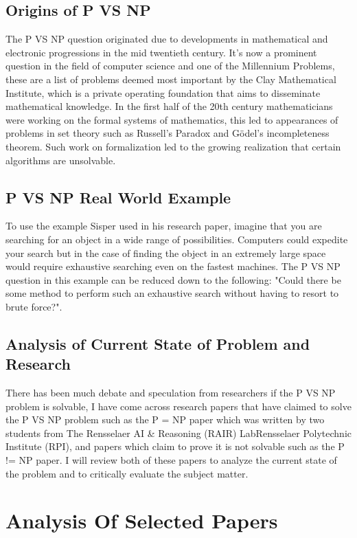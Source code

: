 \documentclass{report}
\begin{document}
\section{Origins of P VS NP}
The P VS NP question originated due to developments in mathematical and electronic progressions in the mid twentieth century\cite{HistoryOfPVsNP}. It's now a prominent question in the field of computer science and one of the Millennium Problems\cite{Millennium}, these are a list of problems deemed most important by the Clay Mathematical Institute, which is a private operating foundation that aims to disseminate mathematical knowledge\cite{AboutMillennium}.  In the first half of the 20th century mathematicians were working on the formal systems of mathematics\cite{ResearchPaperFormalizeMathematics}, this led to appearances of problems in set theory such as Russell's Paradox\cite{RussellParadox} and Gödel's incompleteness theorem\cite{Godel}. Such work on formalization led to the growing realization that certain algorithms are unsolvable\cite{HistoryOfPVsNP}.
\section{P VS NP Real World Example}
To use the example Sisper used in his research paper\cite{HistoryOfPVsNP}, imagine that you are searching for an object in a wide range of possibilities.  Computers could expedite your search but in the case of finding the object in an extremely large space would require exhaustive searching even on the fastest machines.  The P VS NP question in this example can be reduced down to the following: "Could there be some method to perform such an exhaustive search without having to resort to brute force?".
\section{Analysis of Current State of Problem and Research}
There has been much debate and speculation from researchers if the P VS NP problem is solvable, I have come across research papers that have claimed to solve the P VS NP problem such as the P = NP paper\cite{PVsNPSolved} which was written by two students from The Rensselaer AI \& Reasoning (RAIR) LabRensselaer Polytechnic Institute (RPI), and papers which claim to prove it is not solvable such as the P != NP paper\cite{P!=NP}. I will review both of these papers to analyze the current state of the problem and to critically evaluate the subject matter.
\chapter{Analysis Of Selected Papers}
\end{document}
